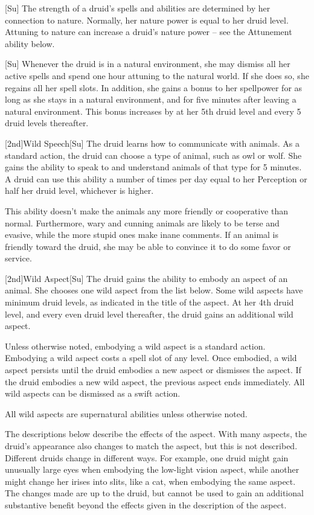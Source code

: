 [Su]
The strength of a druid's spells and abilities are determined by her connection to nature.
Normally, her nature power is equal to her druid level.
Attuning to nature can increase a druid's nature power -- see the Attunement ability below.

[Su]
Whenever the druid is in a natural environment, she may dismiss all her active spells and spend one hour attuning to the natural world.
If she does so, she regains all her spell slots.
In addition, she gains a  bonus to her spellpower for as long as she stays in a natural environment, and for five minutes after leaving a natural environment. This bonus increases by  at her 5th druid level and every 5 druid levels thereafter.

[2nd]{Wild Speech}[Su]
The druid learns how to communicate with animals.
As a standard action, the druid can choose a type of animal, such as owl or wolf.
She gains the ability to speak to and understand animals of that type for 5 minutes.
A druid can use this ability a number of times per day equal to her Perception or half her druid level, whichever is higher.

This ability doesn't make the animals any more friendly or cooperative than normal.
Furthermore, wary and cunning animals are likely to be terse and evasive, while the more stupid ones make inane comments.
If an animal is friendly toward the druid, she may be able to convince it to do some favor or service.

[2nd]{Wild Aspect}[Su]
The druid gains the ability to embody an aspect of an animal.
She chooses one wild aspect from the list below.
Some wild aspects have minimum druid levels, as indicated in the title of the aspect.
At her 4th druid level, and every even druid level thereafter, the druid gains an additional wild aspect.

Unless otherwise noted, embodying a wild aspect is a standard action.
Embodying a wild aspect costs a spell slot of any level.
Once embodied, a wild aspect persists until the druid embodies a new aspect or dismisses the aspect.
If the druid embodies a new wild aspect, the previous aspect ends immediately.
All wild aspects can be dismissed as a swift action.

All wild aspects are supernatural abilities unless otherwise noted.

The descriptions below describe the effects of the aspect.
With many aspects, the druid's appearance also changes to match the aspect, but this is not described.
Different druids change in different ways.
For example, one druid might gain unusually large eyes when embodying the low-light vision aspect, while another might change her irises into slits, like a cat, when embodying the same aspect.
The changes made are up to the druid, but cannot be used to gain an additional substantive benefit beyond the effects given in the description of the aspect.

